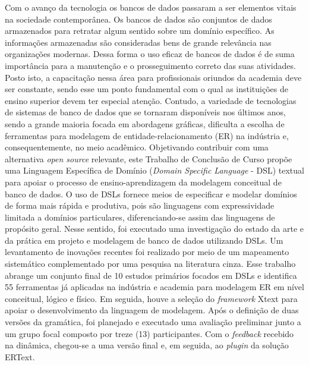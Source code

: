\begin{resumo}


Com o avanço da tecnologia os bancos de dados passaram a ser elementos vitais na sociedade contemporânea. 
Os bancos de dados são conjuntos de dados armazenados para retratar algum sentido sobre um domínio específico. 
As informações armazenadas são consideradas bens de grande relevância nas organizações modernas. 
Dessa forma o uso eficaz de bancos de dados é de suma importância para a manutenção e o prosseguimento correto das suas atividades. 
Posto isto, a capacitação nessa área para profissionais oriundos da academia deve ser constante, sendo esse um ponto fundamental com o qual as instituições de ensino superior devem ter especial atenção.
Contudo, a variedade de tecnologias de sistemas de banco de dados que se tornaram disponíveis nos últimos anos, sendo a grande maioria focada em abordagens gráficas, dificulta a escolha de ferramentas para modelagem de entidade-relacionamento (ER) na indústria e, consequentemente, no meio acadêmico.
Objetivando contribuir com uma alternativa \textit{open source} relevante, este Trabalho de Conclusão de Curso propõe uma Linguagem Específica de Domínio (\textit{Domain Specific Language} - DSL) textual para apoiar o processo de ensino-aprendizagem da modelagem conceitual de banco de dados. 
O uso de DSLs fornece meios de especificar e modelar domínios de forma mais rápida e produtiva, pois são linguagens com expressividade limitada a domínios particulares, diferenciando-se assim das linguagens de propósito geral. 
Nesse sentido, foi executado uma investigação do estado da arte e da prática em projeto e modelagem de banco de dados utilizando DSLs. 
Um levantamento de inovações recentes foi realizado por meio de um mapeamento sistemático complementado por uma pesquisa na literatura cinza.
Esse trabalho abrange um conjunto final de 10 estudos primários focados em DSLs e identifica 55 ferramentas já aplicadas na indústria e academia para modelagem ER em nível conceitual, lógico e físico.
Em seguida, houve a seleção do \textit{framework} Xtext para apoiar o desenvolvimento da linguagem de modelagem.
Após o definição de duas versões da gramática, foi planejado e executado uma avaliação preliminar junto a um grupo focal composto por treze (13) participantes.
Com o \textit{feedback} recebido na dinâmica, chegou-se a uma versão final e, em seguida, ao \textit{plugin} da solução ERText.

\end{resumo}
